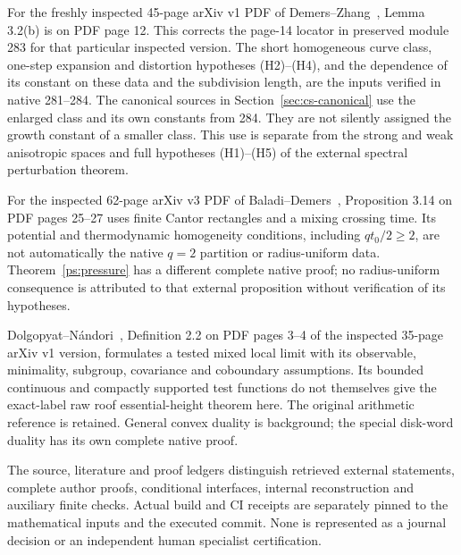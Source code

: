 For the freshly inspected 45-page arXiv v1 PDF of
Demers--Zhang~\cite{DZUniform}, Lemma 3.2(b) is on PDF page 12.
This corrects the page-14 locator in preserved module 283 for that
particular inspected version. The short homogeneous curve class,
one-step expansion and distortion hypotheses (H2)--(H4), and the
dependence of its constant on these data and the subdivision
length, are the inputs verified in native 281--284. The canonical
sources in Section~\ref{sec:cs-canonical} use the enlarged class
and its own constants from 284. They are not silently assigned the
growth constant of a smaller class. This use is separate from the
strong and weak anisotropic spaces and full hypotheses (H1)--(H5)
of the external spectral perturbation theorem.

For the inspected 62-page arXiv v3 PDF of
Baladi--Demers~\cite{BDPressure}, Proposition 3.14 on PDF pages
25--27 uses finite Cantor rectangles and a mixing crossing time.
Its potential and thermodynamic homogeneity conditions, including
$qt_0/2\ge2$, are not automatically the native $q=2$ partition or
radius-uniform data. Theorem~\ref{ps:pressure} has a different
complete native proof; no radius-uniform consequence is attributed
to that external proposition without verification of its hypotheses.

Dolgopyat--N\'andori~\cite{DNFlow}, Definition 2.2 on PDF pages
3--4 of the inspected 35-page arXiv v1 version, formulates a tested
mixed local limit with its observable, minimality, subgroup,
covariance and coboundary assumptions. Its bounded continuous and
compactly supported test functions do not themselves give the
exact-label raw roof essential-height theorem here. The original
arithmetic reference is retained. General convex duality
\cite{BVNotes} is background; the special disk-word duality has
its own complete native proof.

The source, literature and proof ledgers distinguish retrieved
external statements, complete author proofs, conditional interfaces,
internal reconstruction and auxiliary finite checks. Actual build
and CI receipts are separately pinned to the mathematical inputs
and the executed commit. None is represented as a journal decision
or an independent human specialist certification.
